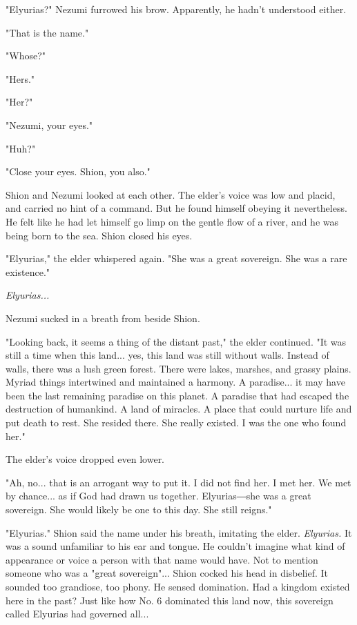 "Elyurias?" Nezumi furrowed his brow. Apparently, he hadn't understood
either.

"That is the name."

"Whose?"

"Hers."

"Her?"

"Nezumi, your eyes."

"Huh?"

"Close your eyes. Shion, you also."

Shion and Nezumi looked at each other. The elder's voice was low and
placid, and carried no hint of a command. But he found himself obeying
it nevertheless. He felt like he had let himself go limp on the gentle
flow of a river, and he was being born to the sea. Shion closed his
eyes.

"Elyurias," the elder whispered again. "She was a great sovereign. She
was a rare existence."

\emph{Elyurias...}

Nezumi sucked in a breath from beside Shion.

"Looking back, it seems a thing of the distant past," the elder
continued. "It was still a time when this land... yes, this land was
still without walls. Instead of walls, there was a lush green forest.
There were lakes, marshes, and grassy plains. Myriad things intertwined
and maintained a harmony. A paradise... it may have been the last
remaining paradise on this planet. A paradise that had escaped the
destruction of humankind. A land of miracles. A place that could nurture
life and put death to rest. She resided there. She really existed. I was
the one who found her."

The elder's voice dropped even lower.

"Ah, no... that is an arrogant way to put it. I did not find her. I met
her. We met by chance... as if God had drawn us together. Elyurias―she
was a great sovereign. She would likely be one to this day. She still
reigns."

"Elyurias." Shion said the name under his breath, imitating the elder.
\emph{Elyurias.} It was a sound unfamiliar to his ear and tongue. He couldn't
imagine what kind of appearance or voice a person with that name would
have. Not to mention someone who was a "great sovereign"... Shion cocked
his head in disbelief. It sounded too grandiose, too phony. He sensed
domination. Had a kingdom existed here in the past? Just like how No. 6
dominated this land now, this sovereign called Elyurias had governed
all...

